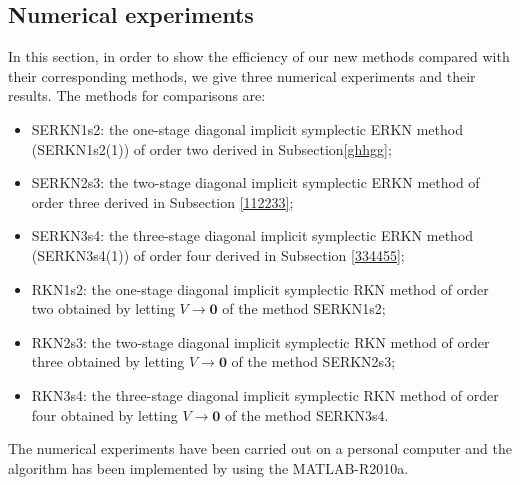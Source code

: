 \documentclass{article}
\begin{document}
\subsection{Numerical experiments}
In this section, in order to show the efficiency of our new methods
compared with their corresponding methods, we give three numerical
experiments and their results. The methods for comparisons are:
\begin{itemize}\itemsep=-0.2mm
\item SERKN1s2: the one-stage  diagonal implicit symplectic ERKN method (SERKN1s2(1)) of order two derived in Subsection\ref{ghhgg};

\item SERKN2s3: the two-stage  diagonal implicit symplectic ERKN method of order three derived in Subsection \ref{112233};

\item SERKN3s4: the three-stage diagonal implicit symplectic ERKN method (SERKN3s4(1)) of order four derived in Subsection \ref{334455};

\item RKN1s2: the one-stage  diagonal implicit symplectic RKN method of order two obtained by
 letting $V \rightarrow \textbf{0}$  of the method SERKN1s2;
\item RKN2s3: the two-stage  diagonal implicit symplectic RKN method of order three obtained by
 letting $V \rightarrow \textbf{0}$  of the method SERKN2s3;
\item RKN3s4: the three-stage  diagonal implicit symplectic RKN method of order four obtained by
 letting $V \rightarrow \textbf{0}$  of the method SERKN3s4.
\end{itemize}
The numerical experiments have been carried out on a personal
computer and the algorithm has been implemented by using the
MATLAB-R2010a.
\end{document}

